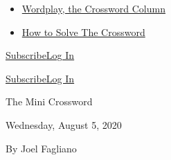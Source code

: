 \begin{itemize}
\tightlist
\item
  \href{https://www.nytimes.com/column/wordplay}{Wordplay, the Crossword
  Column}
\item
  \href{https://www.nytimes.com/guides/crosswords/how-to-solve-a-crossword-puzzle}{How
  to Solve The Crossword}
\end{itemize}

\href{https://www.nytimes.com/subscription/games?campaignId=9HH7K}{Subscribe}\href{https://myaccount.nytimes.com/auth/login?application=crosswords\&asset=navigation-drawer\&client_id=games\&redirect_uri=\&response_type=cookie}{Log
In}

\href{https://www.nytimes.com/subscription/games?campaignId=9JF99}{Subscribe}\href{https://myaccount.nytimes.com/auth/login?application=crosswords\&asset=navigation-bar\&client_id=games\&redirect_uri=\&response_type=cookie}{Log
In}

The Mini Crossword

Wednesday, August 5, 2020

By Joel Fagliano


